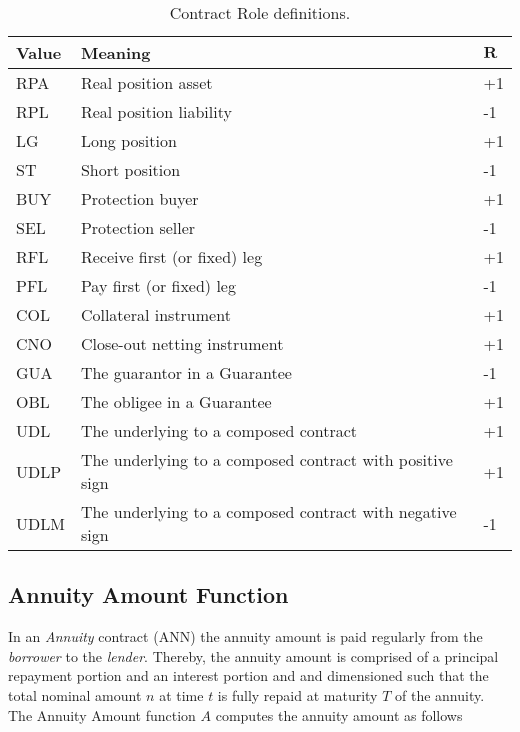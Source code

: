 \documentclass[9pt,oneside]{amsart}
\newcommand{\annfunc}{A}
\begin{document}
\begin{multicols}{2}
\begin{table}[H]
	\centering
	\begin{tabular}{| p{0.5in}p{1.5in}p{0.2in} |}
	\hline
	\textbf{Value} & \textbf{Meaning} & $\textbf{R}$ \\
	\hline
	RPA & Real position asset & +1 \\
	\hline
	RPL & Real position liability & -1 \\
	\hline
	LG & Long position & +1 \\
	\hline
	ST & Short position & -1 \\
	\hline
	BUY & Protection buyer & +1 \\
	\hline
	SEL & Protection seller & -1 \\
	\hline
	RFL & Receive first (or fixed) leg & +1 \\
	\hline
	PFL & Pay first (or fixed) leg & -1 \\
	\hline
	COL & Collateral instrument & +1 \\
	\hline
	CNO & Close-out netting instrument & +1 \\
	\hline
	GUA & The guarantor in a Guarantee & -1 \\
	\hline
	OBL & The obligee in a Guarantee & +1 \\
	\hline
	UDL & The underlying to a composed contract & +1 \\
	\hline
	UDLP & The underlying to a composed contract with positive sign  & +1 \\
	\hline
	UDLM & The underlying to a composed contract with negative sign & -1 \\
	\hline
	\end{tabular}
	\caption{Contract Role definitions.}
	\label{tbl:cntrl}
\end{table}


\subsection{Annuity Amount Function}\label{sec:annamount}

In an \textit{Annuity} contract (ANN) the annuity amount is paid regularly from the \textit{borrower} to the \textit{lender}. Thereby, the annuity amount is comprised of a principal repayment portion and an interest portion and and dimensioned such that the total nominal amount $n$ at time $t$ is fully repaid at maturity $T$ of the annuity. The Annuity Amount function $\annfunc$ computes the annuity amount as follows


\end{multicols}
\end{document}
